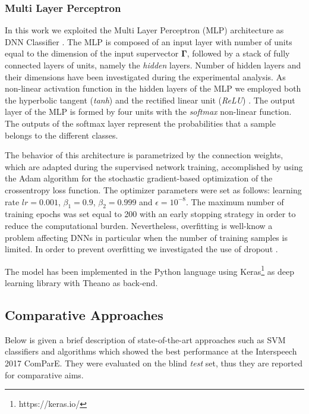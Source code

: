 \subsubsection{Multi Layer Perceptron}
In this work we exploited the Multi Layer Perceptron (MLP) architecture as DNN Classifier \cite{Rumelhart86-LRB}. The MLP is composed of an input layer with number of units equal to the dimension of the input supervector $\mathbf{\Gamma}$, followed by a stack of fully connected layers of units, namely the \textit{hidden} layers. Number of hidden layers and their dimensions have been investigated during the experimental analysis.
As non-linear activation function in the hidden layers of the MLP we employed both the hyperbolic tangent (\textit{tanh}) and the rectified linear unit (\textit{ReLU}) \cite{Nair2010}.
The output layer of the MLP is formed by four units with the \textit{softmax} non-linear function. 
The outputs of the softmax layer represent the probabilities that a sample belongs to the different classes. 

The  behavior  of  this architecture  is  parametrized  by  the connection weights, which are adapted during the supervised network training, accomplished by using the Adam algorithm \cite{kingma2014adam} for the stochastic gradient-based optimization of the crossentropy loss function. The optimizer parameters were set as follows: learning rate $lr=0.001$, $\beta_1 = 0.9$, $\beta_2 = 0.999$ and $\epsilon = 10^{-8}$. The maximum number of training epochs was set equal to 200 with an early stopping strategy in order to reduce the computational burden. 
Nevertheless, overfitting is well-know a problem affecting DNNs in particular when the number of training samples is limited. In order to prevent overfitting we investigated the use of dropout \cite{srivastava2014dropout}.

The model has been implemented in the Python language using Keras\footnote{https://keras.io/} as deep learning library with Theano\cite{2016arXiv160502688short} as back-end.



\subsection{Comparative Approaches}

Below is given a brief description of state-of-the-art approaches such as SVM classifiers and algorithms which showed the best performance at the Interspeech 2017 ComParE. They were evaluated on the blind \textit{test} set, thus they are reported for comparative aims.

